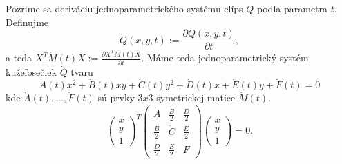 Pozrime sa deriváciu jednoparametrického systému elíps $Q$ podľa parametra $t.$ Definujme
$$ 
\dot{Q}(x,y,t) := \frac{\partial Q (x,y,t)}{\partial t},
$$
a teda $X^T \dot{M}(t)X := \frac{\partial X^TM(t)X}{\partial t}.
$
Máme teda jednoparametrický systém kužeľosečiek $\dot{Q}$ tvaru 
$$
\dot{A}(t)x^2 + \dot{B}(t)xy + \dot{C}(t)y^2 + \dot{D}(t)x + \dot{E}(t)y + \dot{F}(t) = 0$$
kde $\dot{A}(t), \dots, \dot{F}(t)$ sú prvky $3x3$ symetrickej matice $\dot{M}(t).$
$$
\left(\begin{matrix} x \\ y \\ 1 
\end{matrix} \right)^T \left(\begin{matrix} 
\dot{A} & \frac{\dot{B}}{2} & \frac{\dot{D}}{2} \\
\frac{\dot{B}}{2} & \dot{C} & \frac{\dot{E}}{2} \\
\frac{\dot{D}}{2} & \frac{\dot{E}}{2} & F 
\end{matrix} \right)\left(\begin{matrix} x \\ y \\ 1 
\end{matrix} \right) = 0.
$$
